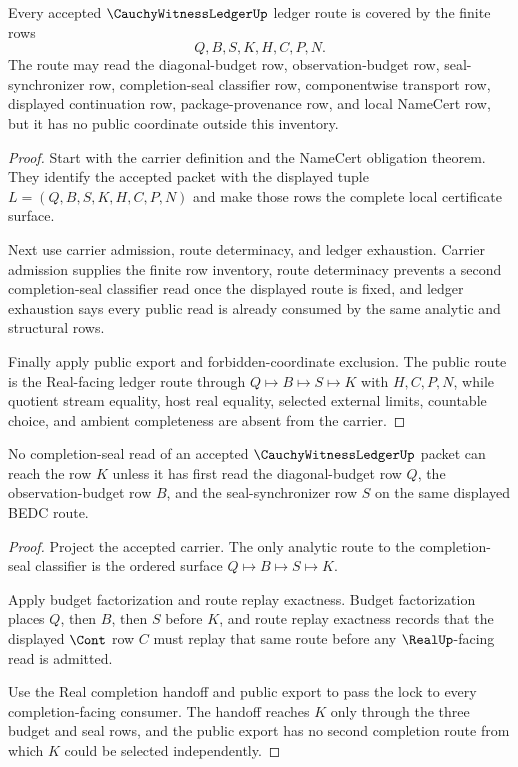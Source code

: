 \begin{theorem}
\label{thm:cauchy-witness-ledger-route-coverage}
Every accepted $\CauchyWitnessLedgerUp$ ledger route is covered by the finite
rows
$$
Q,B,S,K,H,C,P,N.
$$
The route may read the diagonal-budget row, observation-budget row,
seal-synchronizer row, completion-seal classifier row, componentwise transport
row, displayed continuation row, package-provenance row, and local NameCert
row, but it has no public coordinate outside this inventory.
\end{theorem}
\begin{proof}
Start with the carrier definition and the NameCert obligation theorem. They
identify the accepted packet with the displayed tuple
$L=(Q,B,S,K,H,C,P,N)$ and make those rows the complete local certificate
surface.

Next use carrier admission, route determinacy, and ledger exhaustion. Carrier
admission supplies the finite row inventory, route determinacy prevents a
second completion-seal classifier read once the displayed route is fixed, and
ledger exhaustion says every public read is already consumed by the same
analytic and structural rows.

Finally apply public export and forbidden-coordinate exclusion. The public
route is the Real-facing ledger route through $Q \longmapsto B \longmapsto S
\longmapsto K$ with $H,C,P,N$, while quotient stream equality, host real
equality, selected external limits, countable choice, and ambient completeness
are absent from the carrier.
\end{proof}

\begin{theorem}
\label{thm:cauchy-witness-ledger-budget-seal-lock}
No completion-seal read of an accepted $\CauchyWitnessLedgerUp$ packet can
reach the row $K$ unless it has first read the diagonal-budget row $Q$, the
observation-budget row $B$, and the seal-synchronizer row $S$ on the same
displayed BEDC route.
\end{theorem}
\begin{proof}
Project the accepted carrier. The only analytic route to the completion-seal
classifier is the ordered surface
$Q \longmapsto B \longmapsto S \longmapsto K$.

Apply budget factorization and route replay exactness. Budget factorization
places $Q$, then $B$, then $S$ before $K$, and route replay exactness records
that the displayed $\Cont$ row $C$ must replay that same route before any
$\RealUp$-facing read is admitted.

Use the Real completion handoff and public export to pass the lock to every
completion-facing consumer. The handoff reaches $K$ only through the three
budget and seal rows, and the public export has no second completion route
from which $K$ could be selected independently.
\end{proof}

